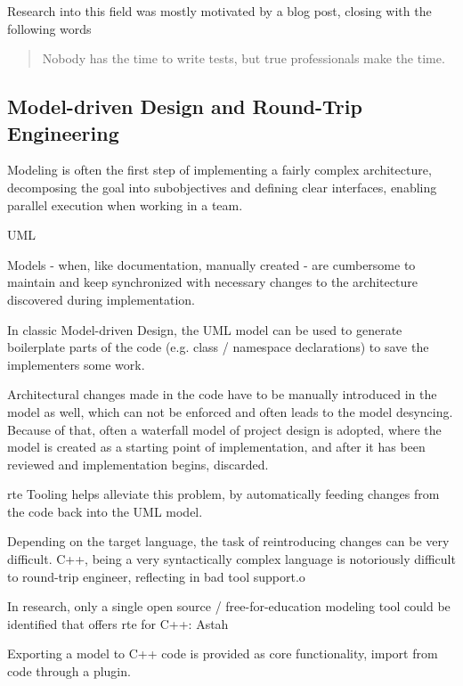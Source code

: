 Research into this field was mostly motivated by a blog post, closing with the following words
\begin{quote}
Nobody has the time to write tests, but true professionals make the time. 
\end{quote}



\subsection{Model-driven Design and Round-Trip Engineering}
Modeling is often the first step of implementing a fairly complex architecture, 
decomposing the goal into subobjectives and defining clear interfaces, enabling parallel execution when working in a team.

UML

Models - when, like documentation, manually created - are cumbersome to maintain and keep synchronized with necessary changes to the architecture discovered during implementation.

In classic Model-driven Design, the UML model can be used to generate boilerplate parts of the code (e.g. class / namespace declarations) to save the implementers some work.

Architectural changes made in the code have to be manually introduced in the model as well, which can not be enforced and often leads to the model desyncing. Because of that, often a waterfall model of project design is adopted, where the model is created as a starting point of implementation, and after it has been reviewed and implementation begins, discarded.

\gls{rte} Tooling helps alleviate this problem, by automatically feeding changes from the code back into the UML model.

Depending on the target language, the task of reintroducing changes can be very difficult. C++, being a very syntactically complex language is notoriously difficult to round-trip engineer, reflecting in bad tool support.o

In research, only a single open source / free-for-education modeling tool could be identified that offers \gls{rte} for C++: Astah

Exporting a model to C++ code is provided as core functionality, import from code through a plugin.

